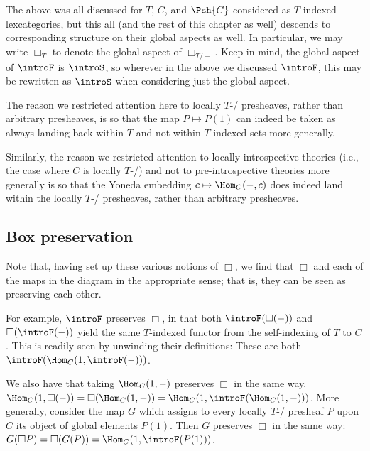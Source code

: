 The above was all discussed for $T$, $C$, and $\Psh{C}$ considered as $T$-indexed lexcategories, but this all (and the rest of this chapter as well) descends to corresponding structure on their global aspects as well. In particular, we may write $\Box_{T}$ to denote the global aspect of $\Box_{T/-}$. Keep in mind, the global aspect of $\introF$ is $\introS$, so wherever in the above we discussed $\introF$, this may be rewritten as $\introS$ when considering just the global aspect.

\bigskip
\begin{remark}\label{BoxNotationSmallnessConcerns}
The reason we restricted attention here to locally $T$-\repsmall/ presheaves, rather than arbitrary presheaves, is so that the map $P \mapsto P(1)$ can indeed be taken as always landing back within $T$ and not within $T$-indexed sets more generally.

Similarly, the reason we restricted attention to locally introspective theories (i.e., the case where $C$ is locally $T$-\repsmall/) and not to pre-introspective theories more generally is so that the Yoneda embedding $c \mapsto \Hom_C(-, c)$ does indeed land within the locally $T$-\repsmall/ presheaves, rather than arbitrary presheaves.
\end{remark}

\subsection{Box preservation}

Note that, having set up these various notions of $\Box$, we find that $\Box$ and each of the maps in the diagram  in the appropriate sense; that is, they can be seen as preserving each other.

For example, $\introF$ preserves $\Box$, in that both $\introF(\Box(-))$ and $\Box(\introF(-))$ yield the same $T$-indexed functor from the self-indexing of $T$ to $C$. This is readily seen by unwinding their definitions: These are both $\introF(\Hom_C(1, \introF(-)))$.

We also have that taking $\Hom_C(1, -)$ preserves $\Box$ in the same way. $\Hom_C(1, \Box(-)) = \Box(\Hom_C(1, -)) = \Hom_C(1, \introF(\Hom_C(1, -)))$. More generally, consider the map $G$ which assigns to every locally $T$-\repsmall/ presheaf $P$ upon $C$ its object of global elements $P(1)$. Then $G$ preserves $\Box$ in the same way: $G(\Box P) = \Box(G(P)) = \Hom_C(1, \introF(P(1)))$.

